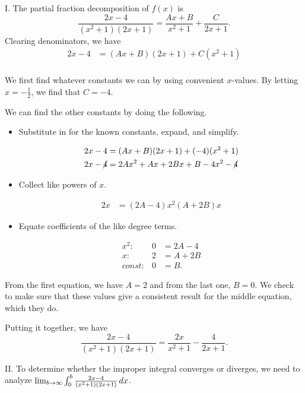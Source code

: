 \documentclass[handout]{ximera}
\begin{document}
\begin{freeResponse}
I. The partial fraction decomposition of $f(x)$ is 
$$
\frac{2x-4}{(x^2+1)(2x+1)} = \frac{Ax+B}{x^2+1} + \frac{C}{2x+1}.
$$
Clearing denominators, we have
\begin{align*}
2x-4 &= (Ax+B)(2x+1) + C(x^2+1) \\
\end{align*}

We first find whatever constants we can by using convenient $x$-values.  By letting $x=-\frac{1}{2}$, we find that $C=-4$.

We can find the other constants by doing the following.

\begin{itemize}
\item Substitute in for the known constants, expand, and simplify.

\begin{align*}
2x-4 &= (Ax+B)(2x+1) + (-4)(x^2+1) \\
2x-\cancel{4} &= 2Ax^2+Ax+2Bx+B - 4x^2-\cancel{4}
\end{align*}

\item Collect like powers of $x$.

\begin{align*}
2x &= (2A-4)x^2 (A+2B)x 
\end{align*}

\item Equate coefficients of the like degree terms.

\[
\begin{array}{rll}
x^2: & 0 &= 2A-4 \\ 
x: & 2 &= A + 2B \\ 
const: & 0 &= B.
\end{array}
\]
\end{itemize}

From the first equation, we have $A=2$ and from the last one, $B=0$.  We check to make sure that these values give a consistent result for the middle equation, which they do.
 
Putting it together, we have 
$$
\frac{2x-4}{(x^2+1)(2x+1)} = \frac{2x}{x^2+1} - \frac{4}{2x+1}.
$$

II. To determine whether the improper integral converges or diverges, we need to analyze $\lim_{b \to \infty} \int_0^b \frac{2x-4}{(x^2+1)(2x+1)}  \mathop{}\!d x$.


\end{freeResponse}
\end{document}
